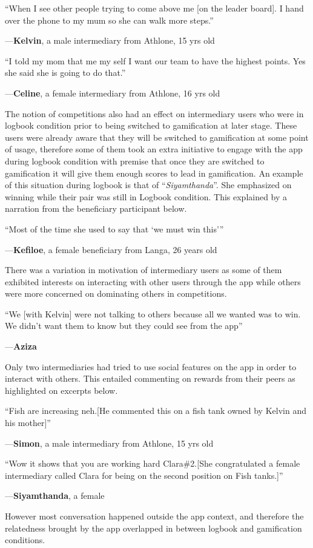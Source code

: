 \documentclass{sig-alternate}
\newenvironment{myquote}
               {\list{}{\rightmargin   \leftmargin
                        \parsep        0in }%
                \item\relax}
               {\endlist}
\newcommand{\userquote}[2]{\begin{samepage}\begin{myquote} 
     \em{\small{#2\begin{flushright}---#1\end{flushright}}}
   \end{myquote}\end{samepage}}
\begin{document}
\userquote{\textbf{Kelvin}, a male intermediary from Athlone, 15 yrs old} {``When I see other people trying to come above me [on the leader board]. I hand over the phone to my mum so she can walk more steps.''} 

\userquote{\textbf{Celine}, a female intermediary from Athlone, 16 yrs old} {``I told my mom that me my self I want our team to have the highest points. Yes she said she is going to do that.''} 

The notion of competitions also had an effect on intermediary users who were in logbook condition prior to being switched to gamification at later stage. These users were already aware that they will be switched to gamification at some point of usage, therefore some of them took an extra initiative to engage with the app during logbook condition with premise that once they are switched to gamification it will give them enough scores to lead in gamification. An example of this situation during logbook is that of ``\emph{Siyamthanda}''. She emphasized on winning while their pair was still in Logbook condition. This explained by a narration from the beneficiary participant below.

\userquote{\textbf{Kefiloe}, a female beneficiary from Langa, 26 years old} {``Most of the time she used to say that `we must win this'''} 

There was a variation in motivation of intermediary users as some of them exhibited interests on interacting with other users through the app while others were more concerned on dominating others in competitions.

\userquote{\textbf{Aziza}} {``We [with Kelvin] were not talking to others because all we wanted was to win. We didn't want them to know but they could see from the app''}
 
Only two intermediaries had tried to use social features on the app in order to interact with others. This entailed commenting on rewards from their peers as highlighted on excerpts below.

\userquote{\textbf{Simon}, a male intermediary from Athlone, 15 yrs old} {``Fish are increasing neh.[He commented this on a fish tank owned by Kelvin and his mother]''} 

\userquote{\textbf{Siyamthanda}, a female } {``Wow it shows that you are working hard  Clara\#2.[She congratulated a female intermediary called Clara for being on the second position on Fish tanks.]''} 

However most conversation happened outside the app context, and therefore the relatedness brought by the app overlapped in between logbook and gamification conditions.
\end{document}
